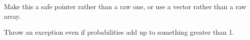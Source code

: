 
\begin{DoxyRefList}
\item[\label{todo__todo000001}%
\Hypertarget{todo__todo000001}%
Member \mbox{\hyperlink{classrcombinator_1_1RandMaths_afbc0d35bd9744ecab1983914ac32d68c}{rcombinator\+:\+:Rand\+Maths\+:\+:choose\+\_\+event}} (double $\ast$events, long num\+\_\+events)]Make this a safe pointer rather than a raw one, or use a vector rather than a raw array.

Throw an exception even if probabilities add up to something greater than 1. 
\end{DoxyRefList}